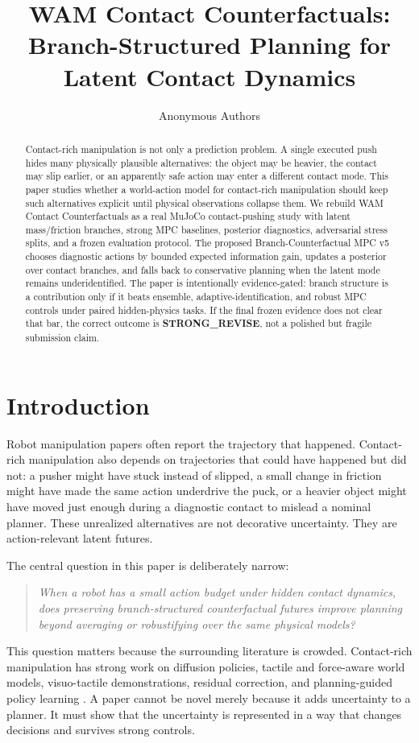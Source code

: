 \documentclass{article}
\title{WAM Contact Counterfactuals: Branch-Structured Planning for Latent Contact Dynamics}
\author{Anonymous Authors}
\newcommand{\methodv}{Branch-Counterfactual MPC v5}
\begin{document}
\maketitle

\begin{abstract}
Contact-rich manipulation is not only a prediction problem.  A single executed push hides many physically plausible alternatives: the object may be heavier, the contact may slip earlier, or an apparently safe action may enter a different contact mode.  This paper studies whether a world-action model for contact-rich manipulation should keep such alternatives explicit until physical observations collapse them.  We rebuild WAM Contact Counterfactuals as a real MuJoCo contact-pushing study with latent mass/friction branches, strong MPC baselines, posterior diagnostics, adversarial stress splits, and a frozen evaluation protocol.  The proposed \methodv{} chooses diagnostic actions by bounded expected information gain, updates a posterior over contact branches, and falls back to conservative planning when the latent mode remains underidentified.  The paper is intentionally evidence-gated: branch structure is a contribution only if it beats ensemble, adaptive-identification, and robust MPC controls under paired hidden-physics tasks.  If the final frozen evidence does not clear that bar, the correct outcome is \textbf{STRONG\_REVISE}, not a polished but fragile submission claim.
\end{abstract}

\section{Introduction}

Robot manipulation papers often report the trajectory that happened.  Contact-rich manipulation also depends on trajectories that could have happened but did not: a pusher might have stuck instead of slipped, a small change in friction might have made the same action underdrive the puck, or a heavier object might have moved just enough during a diagnostic contact to mislead a nominal planner.  These unrealized alternatives are not decorative uncertainty.  They are action-relevant latent futures.

The central question in this paper is deliberately narrow:
\begin{quote}
\emph{When a robot has a small action budget under hidden contact dynamics, does preserving branch-structured counterfactual futures improve planning beyond averaging or robustifying over the same physical models?}
\end{quote}
This question matters because the surrounding literature is crowded.  Contact-rich manipulation has strong work on diffusion policies, tactile and force-aware world models, visuo-tactile demonstrations, residual correction, and planning-guided policy learning \citep{diffusionVLA2026,omniVTA2026,dreamTacVLA2025,forceVLA2025,dexvitac2026,planningGuidedDiffusion2024,tactileSkins2024}.  A paper cannot be novel merely because it adds uncertainty to a planner.  It must show that the uncertainty is represented in a way that changes decisions and survives strong controls.
\end{document}
